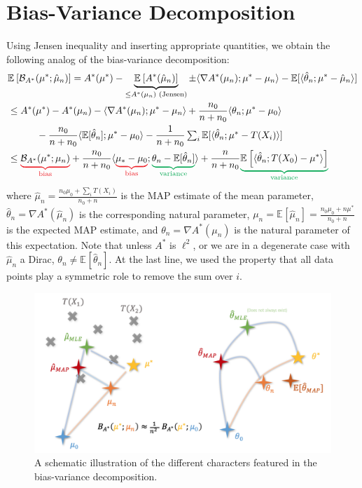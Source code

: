 \documentclass{article}
\newcommand*{\expect}[2][]{\ensuremath{\mathbb{E}_{#1} \left[ #2 \right] }} %
\newcommand{\logpart}{A}
\newcommand{\conj}{\logpart^*}
\newcommand{\bregmanconj}{\cB_{\logpart^*}}
\newcommand{\natp}{\theta}
\begin{document}
\section{Bias-Variance Decomposition}
Using Jensen inequality and inserting appropriate quantities, we obtain the following analog of the bias-variance decomposition:
\newcommand{\bias}[1]{\textcolor{Red}{\underbrace{\textcolor{black}{#1}}_{\text{bias}}}}
\newcommand{\variance}[1]{\textcolor{Green}{\underbrace{\textcolor{black}{#1}}_{\text{variance}}}}
\begin{align}
	& \expect{\bregmanconj(\mu^* ; \hat \mu_n)} 
	= \conj(\mu^* ) 
	- \underbrace{\expect{\conj(\hat \mu_n)}}_{\leq \conj(\mu_n) \text{ (Jensen)} } 
	\pm \langle \nabla \conj( \mu_n) ; \mu^* - \mu_n \rangle
	- \E[\langle \hat \natp_n ; \mu^* - \hat \mu_n  \rangle ] \\
	& \leq \conj(\mu^* ) 
	- \conj(\mu_n) 
	- \langle \nabla \conj( \mu_n) ; \mu^* - \mu_n \rangle
	+ \frac{n_0}{n+n_0} \langle \natp_n ; \mu^* - \mu_0 \rangle \nonumber\\
	& \quad \quad \quad 
	- \frac{n_0}{n+n_0} \langle \E[\hat \natp_n] ; \mu^*- \mu_0  \rangle
	- \inv{n+n_0} \smallsum_i \E[\langle \hat \natp_n ; \mu^* - T(X_i)  \rangle]\\
	& \leq \bias{\bregmanconj(\mu^*; \mu_n)}
	+ \frac{n_0}{n+n_0} \langle  \bias{\mu_* - \mu_0} ; \variance{\natp_n - \E[\hat \natp_n]} \rangle 
	+ \frac{n}{n+n_0} \variance{\expect{\langle \hat \natp_n  ; T(X_0) - \mu^* \rangle } }
\end{align}
where $\hat \mu_n = \frac{n_0 \mu_0 + \sum_i T(X_i)}{n_0 + n}$ is the MAP estimate of the mean parameter, $\hat \natp_n = \nabla \conj(\hat \mu_n)$ is the corresponding natural parameter, 
$\mu_n = \expect{\hat \mu_n} = \frac{n_0 \mu_0 + n \mu^*}{n_0 + n}$ is the expected MAP estimate,
and $\theta_n = \nabla \conj(\mu_n)$ is the natural parameter of this expectation.
Note that unless $\conj$ is $\ell^2$, or we are in a degenerate case with $\hat \mu_n$ a Dirac, $\theta_n \neq \expect{\hat \theta_n}$.
At the last line, we used the property that all data points play a symmetric role to remove the sum over $i$.

\begin{figure}[ht]
	\centering
	\includegraphics[width=.8\textwidth]{figs/bias-variance.png}
	\caption{A schematic illustration of the different characters featured in the bias-variance decomposition.}
	\label{fig:bias-variance}
\end{figure}
\end{document}
